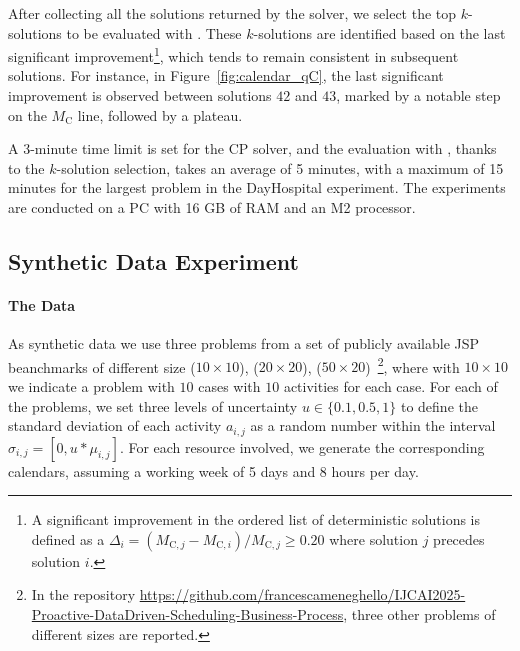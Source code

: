 

After collecting all the solutions returned by the solver, we select the top $k$-solutions to be evaluated with \rims. These $k$-solutions are identified based on the last significant improvement\footnote{A significant improvement in the ordered list of deterministic solutions is defined as a $\Delta_i = (M_{\text{C}, j} - M_{\text{C}, i})/M_{\text{C}, j} \geq 0.20$ where solution $j$ precedes solution $i$.}, which tends to remain consistent in subsequent solutions. For instance, in Figure~\ref{fig:calendar_qC}, the last significant improvement is observed between solutions $42$ and $43$, marked by a notable step on the $M_{\text{C}}$ line, followed by a plateau. %

A 3-minute time limit is set for the CP solver, and the evaluation with \rims, thanks to the $k$-solution selection, takes an average of 5 minutes, with a maximum of 15 minutes for the largest problem in the DayHospital experiment. The experiments are conducted on a PC with 16 GB of RAM and an M2 processor.

\subsection{Synthetic Data Experiment} 

\paragraph{The Data} As synthetic data we use three problems from a set of publicly available JSP beanchmarks of different size  ($10 \times 10$),  ($20 \times 20$),  ($50 \times 20$)~\cite{beanchmarks}\footnote{In the repository \url{https://github.com/francescameneghello/IJCAI2025-Proactive-DataDriven-Scheduling-Business-Process}, three other problems of different sizes are reported.}, where with $10 \times 10$ we indicate a problem with $10$ cases with $10$ activities for each case. For each of the problems, we set three levels of uncertainty $u \in \{0.1, 0.5, 1\}$ to define the standard deviation of each activity $a_{i,j}$ as a random number within the interval $\sigma_{i,j}= [0, u*\mu_{i,j}]$.
For each resource involved, we generate the corresponding calendars, assuming a working week of 5 days and 8 hours per day.


